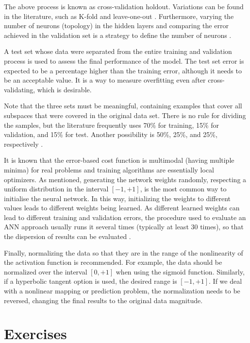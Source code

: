 The above process is known as cross-validation holdout. Variations can be found in the literature, such as K-fold and leave-one-out \cite{haykin, Castro2006FundamentalsON}. Furthermore, varying the number of neurons (topology) in the hidden layers and comparing the error achieved in the validation set is a strategy to define the number of neurons \cite{James2013}.

A test set whose data were separated from the entire training and validation process is used to assess the final performance of the model. The test set error is expected to be a percentage higher than the training error, although it needs to be an acceptable value. It is a way to measure overfitting even after cross-validating, which is desirable. 

Note that the three sets must be meaningful, containing examples that cover all subspaces that were covered in the original data set. There is no rule for dividing the samples, but the literature frequently uses 70\% for training, 15\% for validation, and 15\% for test. Another possibility is 50\%, 25\%, and 25\%, respectively \cite{haykin}.

It is known that the error-based cost function is multimodal (having multiple minima) for real problems and training algorithms are essentially local optimizers. As mentioned, generating the network weights randomly, respecting a uniform distribution in the interval $[-1,+1]$, is the most common way to initialise the neural network. In this way, initializing the weights to different values leads to different weights being learned. As different learned weights can lead to different training and validation errors, the procedure used to evaluate an ANN approach usually runs it several times (typically at least 30 times), so that the dispersion of results can be evaluated \cite{demvsar2006statistical}. 

Finally, normalizing the data so that they are in the range of the nonlinearity of the activation function is recommended. For example, the data should be normalized over the interval $[0,+1]$ when using the sigmoid function. Similarly, if a hyperbolic tangent option is used, the desired range is $[-1,+1]$. If we deal with a nonlinear mapping or prediction problem, the normalization needs to be reversed, changing the final results to the original data magnitude.

\section{Exercises}
\label{ssec:exercises}

